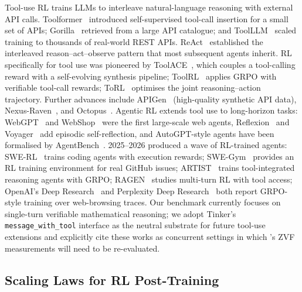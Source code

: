 Tool-use RL trains LLMs to interleave natural-language reasoning with external
API calls. Toolformer~\cite{schick2023toolformer} introduced self-supervised
tool-call insertion for a small set of APIs; Gorilla~\cite{patil2023gorilla}
retrieved from a large API catalogue; and ToolLLM~\cite{qin2024toolllm} scaled
training to thousands of real-world REST APIs. ReAct~\cite{yao2023react}
established the interleaved reason--act--observe pattern that most subsequent
agents inherit. RL specifically for tool use was pioneered by
ToolACE~\cite{liu2024toolace}, which couples a tool-calling reward with a
self-evolving synthesis pipeline; ToolRL~\cite{qian2025toolrl} applies GRPO
with verifiable tool-call rewards; ToRL~\cite{li2025torl} optimises the joint
reasoning--action trajectory. Further advances include
APIGen~\cite{lin2024apigen} (high-quality synthetic API data),
Nexus-Raven~\cite{nexusflow2024nexusraven}, and
Octopus~\cite{chen2024octopus}. Agentic RL extends tool use to long-horizon
tasks: WebGPT~\cite{nakano2021webgpt} and
WebShop~\cite{yao2022webshop} were the first large-scale web agents,
Reflexion~\cite{shinn2023reflexion} and Voyager~\cite{wang2023voyager} add
episodic self-reflection, and AutoGPT-style agents have been formalised by
AgentBench~\cite{liu2024agentbench}. 2025--2026 produced a wave of RL-trained
agents: SWE-RL~\cite{wei2025swerl} trains coding agents with execution
rewards; SWE-Gym~\cite{pan2025swegym} provides an RL training environment for
real GitHub issues; ARTIST~\cite{singh2025artist} trains tool-integrated
reasoning agents with GRPO; RAGEN~\cite{wang2025ragen} studies multi-turn
RL with tool access; OpenAI's Deep Research~\cite{openai2025deepresearch}
and Perplexity Deep Research~\cite{perplexity2025deepresearch} both report
GRPO-style training over web-browsing traces. Our benchmark currently focuses
on single-turn verifiable mathematical reasoning; we adopt Tinker's
\texttt{message\_with\_tool} interface as the neutral substrate for future
tool-use extensions and explicitly cite these works as concurrent settings in
which \ours{}'s ZVF measurements will need to be re-evaluated.

\subsection{Scaling Laws for RL Post-Training}
\label{sec:related:scaling}

